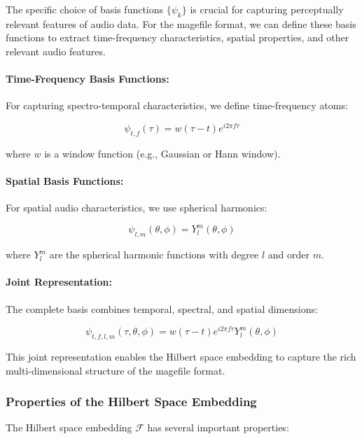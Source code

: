 The specific choice of basis functions $\{\psi_k\}$ is crucial for capturing perceptually relevant features of audio data. For the magefile format, we can define these basis functions to extract time-frequency characteristics, spatial properties, and other relevant audio features.

\paragraph{Time-Frequency Basis Functions:}
For capturing spectro-temporal characteristics, we define time-frequency atoms:

\begin{equation}
\psi_{t,f}(\tau) = w(\tau-t) e^{i2\pi f \tau}
\end{equation}

where $w$ is a window function (e.g., Gaussian or Hann window).

\paragraph{Spatial Basis Functions:}
For spatial audio characteristics, we use spherical harmonics:

\begin{equation}
\psi_{l,m}(\theta, \phi) = Y_l^m(\theta, \phi)
\end{equation}

where $Y_l^m$ are the spherical harmonic functions with degree $l$ and order $m$.

\paragraph{Joint Representation:}
The complete basis combines temporal, spectral, and spatial dimensions:

\begin{equation}
\psi_{t,f,l,m}(\tau, \theta, \phi) = w(\tau-t) e^{i2\pi f \tau} Y_l^m(\theta, \phi)
\end{equation}

This joint representation enables the Hilbert space embedding to capture the rich multi-dimensional structure of the magefile format.

\subsubsection{Properties of the Hilbert Space Embedding}

The Hilbert space embedding $\mathcal{F}$ has several important properties:

